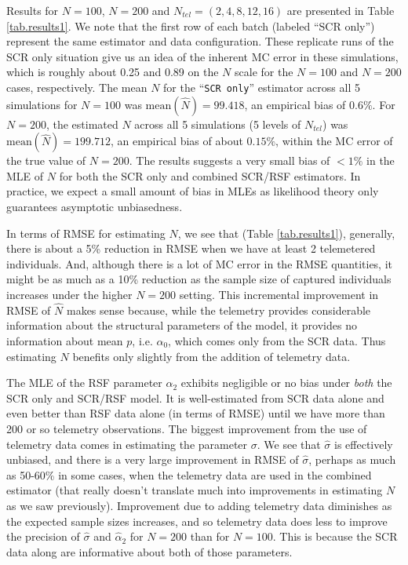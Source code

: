 \documentclass[12pt]{article}
\begin{document}
Results for $N=100$, $N=200$ and $N_{tel}=(2,4,8,12,16)$ are presented
in Table \ref{tab.results1}. We note that the first row of each batch
(labeled ``SCR only'') represent the same estimator and data
configuration. These replicate runs of the SCR only situation give us
an idea of the inherent MC error in these simulations, which is
roughly about 0.25 and 0.89 on the $N$ scale for the $N=100$ and
$N=200$ cases, respectively.  The mean $N$ for the ``\mbox{\tt SCR
  only}'' estimator across all 5 simulations for $N=100$ was
$\mbox{mean}(\hat{N}) = 99.418$, an empirical bias of $0.6\%$. For
$N=200$, the estimated $N$ across all 5 simulations (5 levels of
$N_{tel}$) was $\mbox{mean}(\hat{N}) = 199.712$, an empirical bias of
about $0.15\%$, within the MC error of the true value of $N=200$.  The
results suggests a very small bias of $< 1\%$ in the MLE of $N$ for
both the SCR only and combined SCR/RSF estimators.  In practice, we
expect a small amount of bias in MLEs as likelihood theory only
guarantees asymptotic unbiasedness.


In terms of RMSE for estimating $N$, we see that (Table
\ref{tab.results1}), generally, there is about a 5\% reduction in RMSE
when we have at least 2 telemetered individuals. And, although there
is a lot of MC error in the RMSE quantities, it might be as much as a
10\% reduction as the sample size of captured individuals increases
under the higher $N=200$ setting. This incremental improvement in RMSE
of $\hat{N}$
makes sense because, while the
telemetry provides considerable information about the structural
parameters of the model, it provides no information about mean $p$,
i.e. $\alpha_{0}$, which comes only from the SCR data. Thus estimating
$N$ benefits only slightly from the addition of telemetry data.



The MLE of the RSF parameter $\alpha_{2}$ exhibits negligible or no
bias under {\it both} the SCR only and SCR/RSF model. It is
well-estimated from SCR data alone and even better than RSF data alone
(in terms of RMSE) until we have more than 200 or so telemetry
observations.  The biggest improvement from the use of telemetry data
comes in estimating the parameter $\sigma$. We see that $\hat{\sigma}$
is effectively unbiased, and there is a very large improvement in RMSE
of $\hat{\sigma}$, perhaps as much as 50-60\% in some cases, when the
telemetry data are used in the combined estimator (that really doesn't
translate much into improvements in estimating $N$ as we saw
previously).  Improvement due to adding telemetry data diminishes as
the expected sample sizes increases, and so telemetry data does less
to improve the precision of $\hat{\sigma}$ and $\hat{\alpha}_{2}$ for
$N=200$ than for $N=100$. This is because the SCR data along are
informative about both of those parameters.
\end{document}
